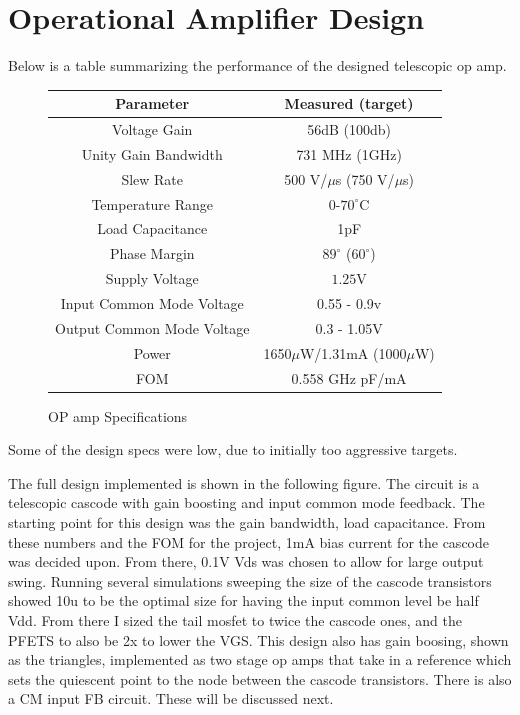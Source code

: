 \documentclass[conference]{IEEEtran}
\begin{document}
\section*{Operational Amplifier Design}
Below is a table summarizing the performance of the designed telescopic op amp.

\begin{figure}[htb]
\centering
\begin{tabular}[width=\textwidth]{|c|c|}
\hline \rule[-2ex]{0pt}{5.5ex} \textbf{Parameter} & \textbf{Measured (target)}  \\ 
\hline \rule[-2ex]{0pt}{5.5ex} Voltage Gain & 56dB (100db) \\ 
\hline \rule[-2ex]{0pt}{5.5ex} Unity Gain Bandwidth & 731 MHz (1GHz)\\ 
\hline \rule[-2ex]{0pt}{5.5ex} Slew Rate & 500 V/$\mu$s (750 V/$\mu$s) \\ 
\hline \rule[-2ex]{0pt}{5.5ex} Temperature Range & 0-$70^\circ$C  \\ 
\hline \rule[-2ex]{0pt}{5.5ex} Load Capacitance & 1pF \\ 
\hline \rule[-2ex]{0pt}{5.5ex} Phase Margin & $89^\circ$ ($60^\circ$) \\ 
\hline \rule[-2ex]{0pt}{5.5ex} Supply Voltage &  $1.25$V\\ 
\hline \rule[-2ex]{0pt}{5.5ex} Input Common Mode Voltage & 0.55 - 0.9v \\ 
\hline \rule[-2ex]{0pt}{5.5ex} Output Common Mode Voltage &  0.3 - 1.05V\\ 
\hline \rule[-2ex]{0pt}{5.5ex} Power &  1650$\mu$W/1.31mA (1000$\mu$W)\\ 
\hline \rule[-2ex]{0pt}{5.5ex} FOM &  0.558 GHz pF/mA\\ 
\hline 
\end{tabular} 
\caption{OP amp Specifications}
\label{lnta}
\end{figure}
Some of the design specs were low, due to initially too aggressive targets.\par

The full design implemented is shown in the following figure. The circuit is a telescopic cascode with gain boosting and input common mode feedback. The starting point for this design was the gain bandwidth, load capacitance. From these numbers and the FOM for the project, 1mA bias current for the cascode was decided upon. From there, 0.1V Vds was chosen to allow for large output swing. Running several simulations sweeping the size of the cascode transistors showed 10u to be the optimal size for having the input common level be half Vdd. From there I sized the tail mosfet to twice the cascode ones, and the PFETS to also be 2x to lower the VGS. This design also has gain boosing, shown as the triangles, implemented as two stage op amps that take in a reference which sets the quiescent point to the node between the cascode transistors. There is also a CM input FB circuit. These will be discussed next.
\end{document}
